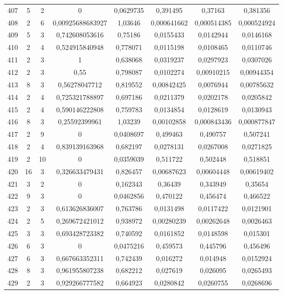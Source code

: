 \begin{longtable}{|c|c|c|c|c|c|c|c|}
407 & 5 & 2 & 0 & 0,0629735 & 0,391495 & 0,37163 & 0,381356  \\
408 & 2 & 6 & 0,00925688683927 & 1,03646 & 0,000641662 & 0,000514385 & 0,000524924  \\
409 & 5 & 3 & 0,742608053616 & 0,75186 & 0,0155433 & 0,0142944 & 0,0146168  \\
410 & 2 & 4 & 0,524915840948 & 0,778071 & 0,0115198 & 0,0108465 & 0,0110746  \\
411 & 2 & 3 & 1 & 0,638068 & 0,0319237 & 0,0297923 & 0,0307026  \\
412 & 2 & 3 & 0,55 & 0,798087 & 0,0102274 & 0,00910215 & 0,00944354  \\
413 & 8 & 3 & 0,56278047712 & 0,819552 & 0,00842425 & 0,0076944 & 0,00785632  \\
414 & 2 & 4 & 0,725321788897 & 0,697186 & 0,0211379 & 0,0202178 & 0,0205842  \\
415 & 2 & 4 & 0,590146222808 & 0,759783 & 0,0134854 & 0,0128619 & 0,0130943  \\
416 & 8 & 3 & 0,25592399961 & 1,03239 & 0,00102858 & 0,000843436 & 0,000877847  \\
417 & 2 & 9 & 0 & 0,0408697 & 0,499463 & 0,490757 & 0,507241  \\
418 & 2 & 4 & 0,839139163968 & 0,682197 & 0,0278131 & 0,0267008 & 0,0271825  \\
419 & 2 & 10 & 0 & 0,0359039 & 0,511722 & 0,502448 & 0,518851  \\
420 & 16 & 3 & 0,326633479431 & 0,826457 & 0,00687623 & 0,00604448 & 0,00619402  \\
421 & 3 & 2 & 0 & 0,162343 & 0,36439 & 0,343949 & 0,35654  \\
422 & 9 & 3 & 0 & 0,0462856 & 0,470122 & 0,456474 & 0,466522  \\
423 & 2 & 3 & 0,613626836007 & 0,763786 & 0,0131498 & 0,0117422 & 0,0121901  \\
424 & 2 & 5 & 0,269672421012 & 0,938972 & 0,00280239 & 0,00262648 & 0,0026463  \\
425 & 3 & 3 & 0,693428723382 & 0,740592 & 0,0161852 & 0,0148598 & 0,015301  \\
426 & 6 & 3 & 0 & 0,0475216 & 0,459573 & 0,445796 & 0,456496  \\
427 & 6 & 3 & 0,667663352311 & 0,742439 & 0,016272 & 0,014948 & 0,0152924  \\
428 & 8 & 3 & 0,961955807238 & 0,682212 & 0,027619 & 0,026095 & 0,0265493  \\
429 & 2 & 3 & 0,929266777582 & 0,664923 & 0,0280842 & 0,0260755 & 0,0268696  \\

\end{longtable}
